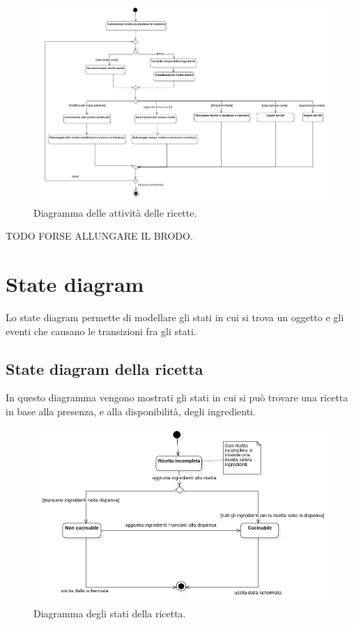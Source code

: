 \begin{figure}[H]
    \includegraphics[width=\linewidth]{images/activity-recipe.png}
    \caption{Diagramma delle attività delle ricette.}
    \label{fig:actrecipe}
\end{figure}

TODO FORSE ALLUNGARE IL BRODO.

\newpage

\section{State diagram}

Lo state diagram permette di modellare gli stati in cui si trova un oggetto e gli eventi che causano le transizioni fra gli stati. 

\subsection{State diagram della ricetta}

In questo diagramma vengono mostrati gli stati in cui si può trovare una ricetta in base alla presenza, e alla disponibilità, degli ingredienti.

\begin{figure}[H]
    \includegraphics[width=\linewidth]{images/state-recipe.png}
    \caption{Diagramma degli stati della ricetta.}
    \label{fig:staterecipe}
\end{figure}

